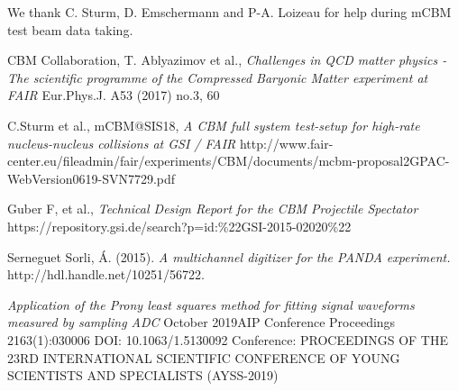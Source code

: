 \documentclass[a4paper,11pt]{article}
\begin{document}
\acknowledgments
We thank C. Sturm, D. Emschermann and P-A. Loizeau for help during mCBM test beam data taking.

\begin{thebibliography}{99}


CBM Collaboration, T. Ablyazimov et al., \emph{Challenges in QCD matter physics -The scientific programme of the Compressed Baryonic Matter experiment at FAIR} Eur.Phys.J. A53 (2017) no.3, 60 


C.Sturm et al., mCBM@SIS18, \emph{A CBM full system test-setup for high-rate nucleus-nucleus collisions at GSI / FAIR} http://www.fair-center.eu/fileadmin/fair/experiments/CBM/documents/mcbm-proposal2GPAC-WebVersion0619-SVN7729.pdf

Guber F, et al., \emph{Technical Design Report for the CBM Projectile Spectator} https://repository.gsi.de/search?p=id:\%22GSI-2015-02020\%22

Serneguet Sorli, Á. (2015). \emph{A multichannel digitizer for the PANDA experiment.} http://hdl.handle.net/10251/56722.

\emph{Application of the Prony least squares method for fitting signal waveforms measured by sampling ADC}
October 2019AIP Conference Proceedings 2163(1):030006
DOI: 10.1063/1.5130092
Conference: PROCEEDINGS OF THE 23RD INTERNATIONAL SCIENTIFIC CONFERENCE OF YOUNG SCIENTISTS AND SPECIALISTS (AYSS-2019)



\end{thebibliography}
\end{document}
